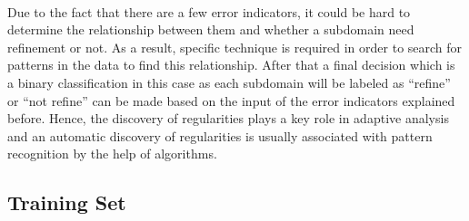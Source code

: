 \paragraph{}
Due to the fact that there are a few error indicators, it could be hard to determine the relationship between them and whether a subdomain need refinement or not.
As a result, specific technique is required in order to search for patterns in the data to find this relationship.
After that a final decision which is a binary classification in this case as each subdomain will be labeled as ``refine'' or ``not refine'' can be made based on the input of the error indicators explained before.
Hence, the discovery of regularities plays a key role in adaptive analysis and an automatic discovery of regularities is usually associated with pattern recognition by the help of algorithms.

\subsection{Training Set}
